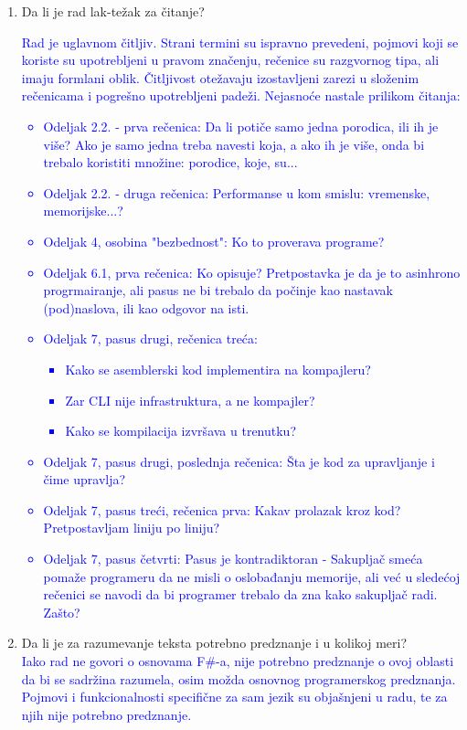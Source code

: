 \documentclass[a4paper]{report}
\newcommand{\odgovor}[1]{\textcolor{blue}{#1}}
\begin{document}
\begin{enumerate}
\item Da li je rad lak-težak za čitanje?\\
\odgovor{
Rad je uglavnom čitljiv. Strani termini su ispravno prevedeni, pojmovi koji se koriste su upotrebljeni u pravom značenju, rečenice su razgvornog tipa, ali imaju formlani oblik. Čitljivost otežavaju izostavljeni zarezi u složenim rečenicama i pogrešno upotrebljeni padeži. Nejasnoće nastale prilikom čitanja:
\begin{itemize}
\item Odeljak 2.2. - prva rečenica: Da li potiče samo jedna porodica, ili ih je više? Ako je samo jedna treba navesti koja, a ako ih je više, onda bi trebalo koristiti množine: porodice, koje, su...
\item Odeljak 2.2. - druga rečenica: Performanse u kom smislu: vremenske, memorijske...?
\item Odeljak 4, osobina "bezbednost": Ko to proverava programe?
\item Odeljak 6.1, prva rečenica: Ko opisuje? Pretpostavka je da je to asinhrono progrmairanje, ali pasus ne bi trebalo da počinje kao nastavak (pod)naslova, ili kao odgovor na isti.
\item Odeljak 7, pasus drugi, rečenica treća:
\begin{itemize}
\item Kako se asemblerski kod implementira na kompajleru?
\item Zar CLI nije infrastruktura, a ne kompajler?
\item Kako se kompilacija izvršava u trenutku?
\end{itemize}
\item Odeljak 7, pasus drugi, poslednja rečenica: Šta je kod za upravljanje i čime upravlja?
\item Odeljak 7, pasus treći, rečenica prva: Kakav prolazak kroz kod? Pretpostavljam liniju po liniju?
\item Odeljak 7, pasus četvrti: Pasus je kontradiktoran - Sakupljač smeća pomaže programeru da ne misli o oslobađanju memorije, ali već u sledećoj rečenici se navodi da bi programer trebalo da zna kako sakupljač radi. Zašto?
\end{itemize}
}

\item Da li je za razumevanje teksta potrebno predznanje i u kolikoj meri?\\
\odgovor{
Iako rad ne govori o osnovama F\#-a, nije potrebno predznanje o ovoj oblasti da bi se sadržina razumela, osim možda osnovnog programerskog predznanja. Pojmovi i funkcionalnosti specifične za sam jezik su objašnjeni u radu, te za njih nije potrebno predznanje.
}


\end{enumerate}
\end{document}
